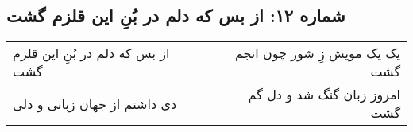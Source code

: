 \begin{center}
\section*{شماره ۱۲: از بس که دلم در بُنِ این قلزم گشت}
\label{sec:012}
\begin{longtable}{l p{0.5cm} r}
از بس که دلم در بُنِ این قلزم گشت
&&
یک یک مویش زِ شور چون انجم گشت
\\
دی داشتم از جهان زبانی و دلی
&&
امروز زبان گنگ شد و دل گم گشت
\\
\end{longtable}
\end{center}
